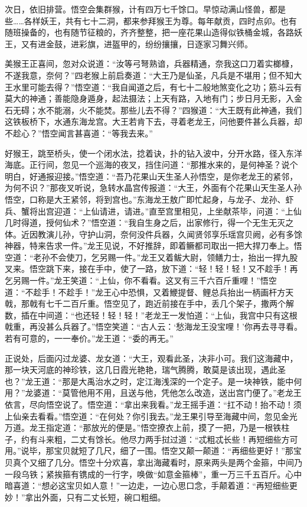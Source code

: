 \documentclass[12pt]{lsbook}
\begin{document}
次日，依旧排营。悟空会集群猴，计有四万七千馀口。早惊动满山怪兽，都是些……各样妖王，共有七十二洞，都来参拜猴王为尊。每年献贡，四时点卯。也有随班操备的，也有随节征粮的，齐齐整整，把一座花果山造得似铁桶金城，各路妖王，又有进金鼓，进彩旗，进盔甲的，纷纷攘攘，日逐家习舞兴师。

美猴王正喜间，忽对众说道：“汝等弓弩熟谙，兵器精通，奈我这口刀着实榔槺，不遂我意，奈何？”四老猴上前启奏道：“大王乃是仙圣，凡兵是不堪用；但不知大王水里可能去得？”悟空道：“我自闻道之后，有七十二般地煞变化之功；筋斗云有莫大的神通；善能隐身遁身，起法摄法；上天有路，入地有门；步日月无影，入金石无碍；水不能溺，火不能焚。那些儿去不得？”四猴道：“大王既有此神通，我们这铁板桥下，水通东海龙宫。大王若肯下去，寻着老龙王，问他要件甚么兵器，却不趁心？”悟空闻言甚喜道：“等我去来。”

好猴王，跳至桥头，使一个闭水法，捻着诀，扑的钻入波中，分开水路，径入东洋海底。正行间，忽见一个巡海的夜叉，挡住问道：“那推水来的，是何神圣？说个明白，好通报迎接。”悟空道：“吾乃花果山天生圣人孙悟空，是你老龙王的紧邻，为何不识？”那夜叉听说，急转水晶宫传报道：“大王，外面有个花果山天生圣人孙悟空，口称是大王紧邻，将到宫也。”东海龙王敖广即忙起身，与龙子、龙孙、虾兵、蟹将出宫迎道：“上仙请进，请进。”直至宫里相见，上坐献茶毕，问道：“上仙几时得道，授何仙术？”悟空道：“我自生身之后，出家修行，得一个无生无灭之体。近因教演儿孙，守护山洞，奈何没件兵器，久闻贤邻享乐瑶宫贝阙，必有多馀神器，特来告求一件。”龙王见说，不好推辞，即着鳜都司取出一把大捍刀奉上。悟空道：“老孙不会使刀，乞另赐一件。”龙王又着鲅大尉，领鳝力士，抬出一捍九股叉来。悟空跳下来，接在手中，使了一路，放下道：“轻！轻！轻！又不趁手！再乞另赐一件。”龙王笑道：“上仙，你不看看。这叉有三千六百斤重哩！”悟空道：“不趁手！不趁手！”龙王心中恐惧，又着鯾提督、鲤总兵抬出一柄画杆方天戟，那戟有七千二百斤重。悟空见了，跑近前接在手中，丢几个架子，撒两个解数，插在中间道：“也还轻！轻！轻！”老龙王一发怕道：“上仙，我宫中只有这根戟重，再没甚么兵器了。”悟空笑道：“古人云：‘愁海龙王没宝哩！’你再去寻寻看。若有可意的，一一奉价。”龙王道：“委的再无。”

正说处，后面闪过龙婆、龙女道：“大王，观看此圣，决非小可。我们这海藏中，那一块天河底的神珍铁，这几日霞光艳艳，瑞气腾腾，敢莫是该出现，遇此圣也？”龙王道：“那是大禹治水之时，定江海浅深的一个定子。是一块神铁，能中何用？”龙婆道：“莫管他用不用，且送与他，凭他怎么改造，送出宫门便了。”老龙王依言，尽向悟空说了。悟空道：“拿出来我看。”龙王摇手道：“扛不动！抬不动！须上仙亲去看看。”悟空道：“在何处？你引我去。”龙王果引导至海藏中间，忽见金光万道。龙王指定道：“那放光的便是。”悟空撩衣上前，摸了一把，乃是一根铁柱子，约有斗来粗，二丈有馀长。他尽力两手挝过道：“忒粗忒长些！再短细些方可用。”说毕，那宝贝就短了几尺，细了一围。悟空又颠一颠道：“再细些更好！”那宝贝真个又细了几分。悟空十分欢喜，拿出海藏看时，原来两头是两个金箍，中间乃一段乌铁；紧挨箍有镌成的一行字，唤做“如意金箍棒”，重一万三千五百斤。心中暗喜道：“想必这宝贝如人意！”一边走，一边心思口念，手颠着道：“再短细些更妙！”拿出外面，只有二丈长短，碗口粗细。
\end{document}
